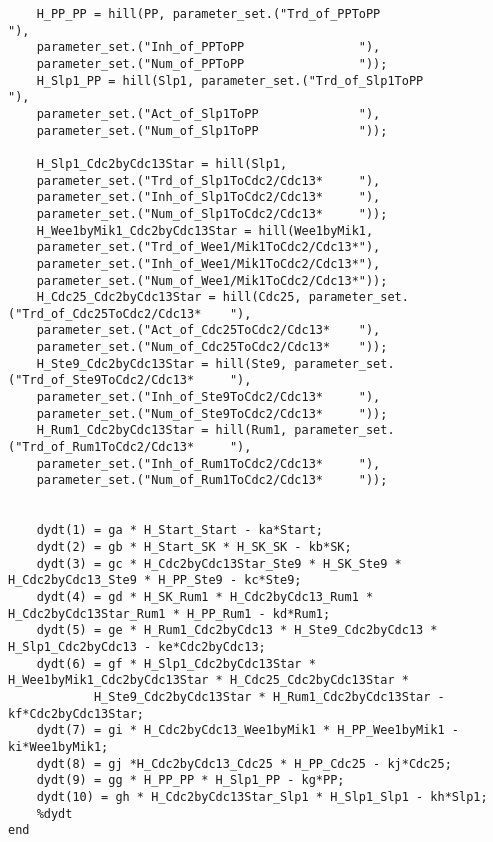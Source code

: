 \documentclass{article}
\begin{document}
\begin{verbatim}
    H_PP_PP = hill(PP, parameter_set.("Trd_of_PPToPP                "), 
    parameter_set.("Inh_of_PPToPP                "), 
    parameter_set.("Num_of_PPToPP                "));
    H_Slp1_PP = hill(Slp1, parameter_set.("Trd_of_Slp1ToPP              "), 
    parameter_set.("Act_of_Slp1ToPP              "), 
    parameter_set.("Num_of_Slp1ToPP              "));
    
    H_Slp1_Cdc2byCdc13Star = hill(Slp1, 
    parameter_set.("Trd_of_Slp1ToCdc2/Cdc13*     "), 
    parameter_set.("Inh_of_Slp1ToCdc2/Cdc13*     "), 
    parameter_set.("Num_of_Slp1ToCdc2/Cdc13*     "));
    H_Wee1byMik1_Cdc2byCdc13Star = hill(Wee1byMik1, 
    parameter_set.("Trd_of_Wee1/Mik1ToCdc2/Cdc13*"), 
    parameter_set.("Inh_of_Wee1/Mik1ToCdc2/Cdc13*"), 
    parameter_set.("Num_of_Wee1/Mik1ToCdc2/Cdc13*"));
    H_Cdc25_Cdc2byCdc13Star = hill(Cdc25, parameter_set.("Trd_of_Cdc25ToCdc2/Cdc13*    "), 
    parameter_set.("Act_of_Cdc25ToCdc2/Cdc13*    "), 
    parameter_set.("Num_of_Cdc25ToCdc2/Cdc13*    "));
    H_Ste9_Cdc2byCdc13Star = hill(Ste9, parameter_set.("Trd_of_Ste9ToCdc2/Cdc13*     "), 
    parameter_set.("Inh_of_Ste9ToCdc2/Cdc13*     "), 
    parameter_set.("Num_of_Ste9ToCdc2/Cdc13*     "));
    H_Rum1_Cdc2byCdc13Star = hill(Rum1, parameter_set.("Trd_of_Rum1ToCdc2/Cdc13*     "), 
    parameter_set.("Inh_of_Rum1ToCdc2/Cdc13*     "), 
    parameter_set.("Num_of_Rum1ToCdc2/Cdc13*     "));
    
    
    dydt(1) = ga * H_Start_Start - ka*Start;
    dydt(2) = gb * H_Start_SK * H_SK_SK - kb*SK;
    dydt(3) = gc * H_Cdc2byCdc13Star_Ste9 * H_SK_Ste9 * H_Cdc2byCdc13_Ste9 * H_PP_Ste9 - kc*Ste9;
    dydt(4) = gd * H_SK_Rum1 * H_Cdc2byCdc13_Rum1 * H_Cdc2byCdc13Star_Rum1 * H_PP_Rum1 - kd*Rum1;
    dydt(5) = ge * H_Rum1_Cdc2byCdc13 * H_Ste9_Cdc2byCdc13 * H_Slp1_Cdc2byCdc13 - ke*Cdc2byCdc13;
    dydt(6) = gf * H_Slp1_Cdc2byCdc13Star * H_Wee1byMik1_Cdc2byCdc13Star * H_Cdc25_Cdc2byCdc13Star * 
            H_Ste9_Cdc2byCdc13Star * H_Rum1_Cdc2byCdc13Star - kf*Cdc2byCdc13Star;
    dydt(7) = gi * H_Cdc2byCdc13_Wee1byMik1 * H_PP_Wee1byMik1 - ki*Wee1byMik1;
    dydt(8) = gj *H_Cdc2byCdc13_Cdc25 * H_PP_Cdc25 - kj*Cdc25;
    dydt(9) = gg * H_PP_PP * H_Slp1_PP - kg*PP;
    dydt(10) = gh * H_Cdc2byCdc13Star_Slp1 * H_Slp1_Slp1 - kh*Slp1;
    %dydt
end
\end{verbatim}
\end{document}
